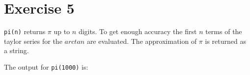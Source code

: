 \documentclass[%
]
{scrartcl}
\theoremstyle{plain}
\begin{document}
\section*{Exercise 5}

\texttt{pi(n)} returns $\pi$ up to $n$ digits. To get enough accuracy the first $n$ terms of the taylor series for the $arctan$ are evaluated. The approximation of $\pi$ is returned as a string.



The output for \texttt{pi(1000)} is:



%
\end{document}
